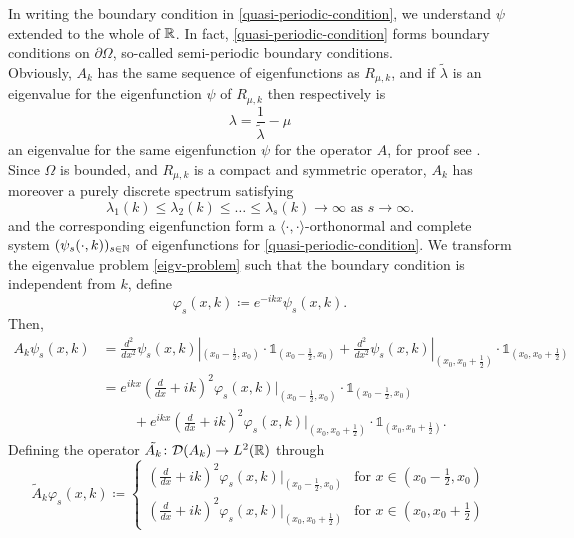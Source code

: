 In writing the boundary condition in \eqref{quasi-periodic-condition}, we understand $\psi$ extended to the whole of $\mathbb{R}$. In fact, \eqref{quasi-periodic-condition} forms boundary conditions on $\partial \Omega$, so-called semi-periodic boundary conditions. 
~\\
Obviously, $A_{k}$ has the same sequence of eigenfunctions as $R_{\mu, k}$, and if $\tilde{\lambda}$ is an eigenvalue for the eigenfunction $\psi$ of $R_{\mu, k}$ then respectively is
	\[ \lambda = \frac{1}{\tilde{\lambda}} - \mu \]
 an eigenvalue for the same eigenfunction $\psi$ for the operator $A$, for proof see \cite{WeisFA}. Since $\Omega$ is bounded, and $R_{\mu, k}$ is a compact and symmetric operator, $A_{k}$ has moreover a purely discrete spectrum satisfying	
	\[ \lambda_{1}(k) \leq \lambda_{2}(k) \leq \dotsc \leq \lambda_{s}(k) \rightarrow \infty \text{ as } s \rightarrow \infty. \]
and the corresponding eigenfunction form a $\langle \cdot , \cdot \rangle$-orthonormal and complete system $(\psi_{s}(\cdot, k))_{s \in \mathbb{N}}$ of eigenfunctions for \eqref{quasi-periodic-condition}. We transform the eigenvalue problem \eqref{eigv-problem} such that the boundary condition is independent from $k$, define
	\[ \varphi_{s}(x, k) \coloneqq e^{-ikx} \psi_{s}(x, k). \]
Then,
	\begin{align*}
		A_{k} \psi_{s}(x, k) & = \frac{d^{2}}{dx^{2}} \psi_{s}(x, k)|_{(x_{0} - \frac{1}{2}, x_{0})} \cdot \mathds{1}_{(x_{0} - \frac{1}{2}, x_{0})} + \frac{d^{2}}{dx^{2}} \psi_{s}(x, k)|_{(x_{0}, x_{0}  + \frac{1}{2})} \cdot \mathds{1}_{(x_{0}, x_{0} + \frac{1}{2})} \\
				& = e^{ikx} \left( \frac{d}{dx} + ik \right)^{2} \varphi_{s}(x, k)|_{(x_{0} - \frac{1}{2}, x_{0})} \cdot \mathds{1}_{(x_{0} - \frac{1}{2}, x_{0})} \\
				& ~\qquad + e^{ikx} \left( \frac{d}{dx} + ik \right)^{2} \varphi_{s}(x, k)|_{(x_{0}, x_{0}  + \frac{1}{2})} \cdot \mathds{1}_{(x_{0}, x_{0} + \frac{1}{2})}.
	\end{align*}
Defining the operator $\tilde{A_{k}} \colon \mathcal{D}(A_{k}) \rightarrow L^{2}(\mathbb{R})$ through 
	\[ \tilde{A}_{k} \varphi_{s}(x, k) \coloneqq \begin{cases}
 		\left( \frac{d}{dx} + ik \right)^{2} \varphi_{s}(x, k)|_{(x_{0} - \frac{1}{2}, x_{0})} & \text{for } x \in (x_{0} - \frac{1}{2}, x_{0}) \\ \left( \frac{d}{dx} + ik \right)^{2} \varphi_{s}(x, k)|_{(x_{0}, x_{0}  + \frac{1}{2})} & \text{for } x \in (x_{0}, x_{0} + \frac{1}{2})
 	\end{cases} \] 
